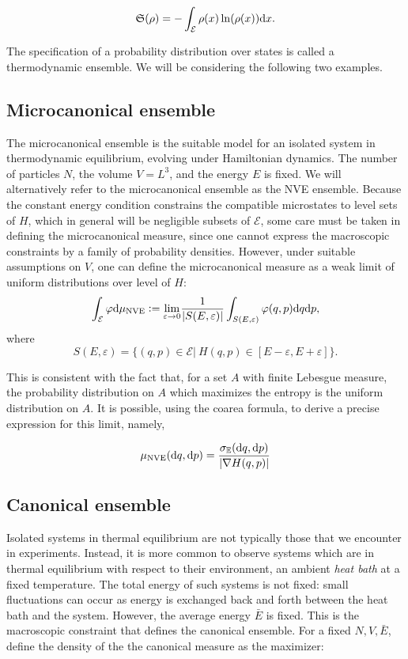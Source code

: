 \begin{equation}
    \label{eq:entropy}
    \mathfrak S(\rho)=-\int_{\mathcal E} \rho(x)\ln(\rho(x))\mathrm{d}x.
\end{equation}

The specification of a probability distribution over states is called a thermodynamic ensemble. We will be considering the following two examples.

\subsection{Microcanonical ensemble}

    The microcanonical ensemble is the suitable model for an isolated system in thermodynamic equilibrium, evolving under Hamiltonian dynamics. The number of particles $N$, the volume $V=L^3$, and the energy $E$ is fixed. We will alternatively refer to the microcanonical ensemble as the NVE ensemble.
     Because the constant energy condition constrains the compatible microstates to level sets of $H$, which in general will be negligible subsets of $\mathcal E$, some care must be taken in defining the microcanonical measure, since one cannot express the macroscopic constraints by a family of probability densities.
      However, under suitable assumptions on $V$, one can define the microcanonical measure as a weak limit of uniform distributions over level  of $H$:
    $$\int_\mathcal{E} \varphi \mathrm{d}\mu_{\mathrm{NVE}} \mathrel{\mathop:}= \underset{\varepsilon \to 0}{\mathrm{lim}} \frac{1}{|S(E,\varepsilon)|}\int_{S(E,\varepsilon)} \varphi(q,p) \mathrm{d} q \mathrm{d} p,$$
    where 
    $$S(E,\varepsilon) = \{ (q,p) \in \mathcal E |\ H(q,p) \in [E-\varepsilon,E+\varepsilon]\}.$$
    
    This is consistent with the fact that, for a set $A$ with finite Lebesgue measure, the probability distribution on $A$ which maximizes the entropy is the uniform distribution on $A$. 
    It is possible, using the coarea formula, to derive a precise expression for this limit, namely,

    \begin{equation}
        \label{eq:microcanonical_measure}
        \mu_{\mathrm{NVE}}(\mathrm{d} q,\mathrm{d} p)=\frac{\sigma_{\mathbb{E}}(\mathrm{d} q,\mathrm{d} p)}{|\nabla H(q,p)|}
    \end{equation}
    


\subsection{Canonical ensemble}\label{par:canonical ensemble}
    Isolated systems in thermal equilibrium are not typically those that we encounter in experiments. Instead, it is more common to observe systems which are in thermal equilibrium with respect to their environment, an ambient \textit{heat bath} at a fixed temperature.
    The total energy of such systems is not fixed: small fluctuations can occur as energy is exchanged back and forth between the heat bath and the system. However, the average energy $\bar E$ is fixed. 
    This is the macroscopic constraint that defines the canonical ensemble. For a fixed $N,V,\bar E$, define the density of the the canonical measure as the maximizer:

